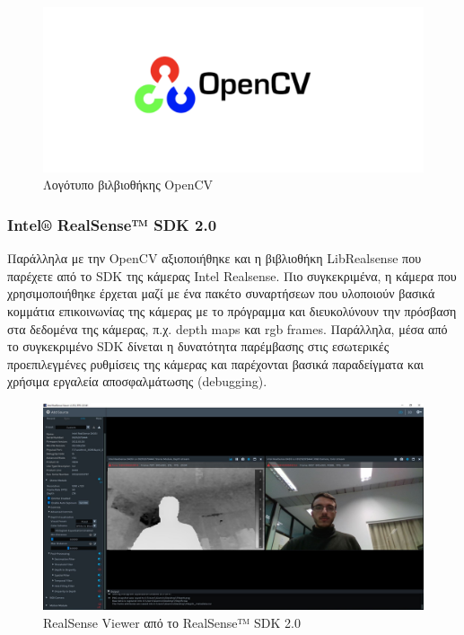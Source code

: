 \begin{figure}[H]
    \centering
    \includegraphics[width=\textwidth]{images/opencv.png}
    \caption{Λογότυπο βιλβιοθήκης OpenCV}
    \label{fig:opencv}
\end{figure}

\subsubsection{Intel® RealSense™ SDK 2.0}
Παράλληλα με την OpenCV αξιοποιήθηκε και η βιβλιοθήκη LibRealsense \cite{IntelRea94:online} που παρέχετε από το SDK της κάμερας Intel Realsense. Πιο συγκεκριμένα, η κάμερα που χρησιμοποιήθηκε έρχεται μαζί με ένα πακέτο συναρτήσεων που υλοποιούν βασικά κομμάτια επικοινωνίας της κάμερας με το πρόγραμμα και διευκολύνουν την πρόσβαση στα δεδομένα της κάμερας, π.χ. depth maps και rgb frames. Παράλληλα, μέσα από το συγκεκριμένο SDK δίνεται η δυνατότητα παρέμβασης στις εσωτερικές προεπιλεγμένες ρυθμίσεις της κάμερας και παρέχονται βασικά παραδείγματα και χρήσιμα εργαλεία αποσφαλμάτωσης (debugging).

\begin{figure}[H]
    \centering
    \includegraphics[width=\textwidth]{images/realsense_viewer.JPG}
    \caption{RealSense Viewer από το RealSense™ SDK 2.0}
    \label{fig:librealsense}
\end{figure}

